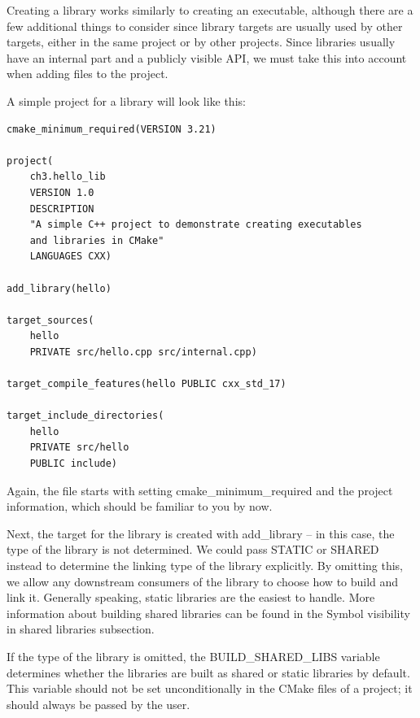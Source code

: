 
Creating a library works similarly to creating an executable, although there are a few additional things to consider since library targets are usually used by other targets, either in the same project or by other projects. Since libraries usually have an internal part and a publicly visible API, we must take this into account when adding files to the project.

A simple project for a library will look like this:

\begin{lstlisting}[style=styleCMake]
cmake_minimum_required(VERSION 3.21)

project(
	ch3.hello_lib
	VERSION 1.0
	DESCRIPTION
	"A simple C++ project to demonstrate creating executables
	and libraries in CMake"
	LANGUAGES CXX)
	
add_library(hello)

target_sources(
	hello
	PRIVATE src/hello.cpp src/internal.cpp)
	
target_compile_features(hello PUBLIC cxx_std_17)

target_include_directories(
	hello
	PRIVATE src/hello
	PUBLIC include)
\end{lstlisting}

Again, the file starts with setting cmake\_minimum\_required and the project information, which should be familiar to you by now.

Next, the target for the library is created with add\_library – in this case, the type of the library is not determined. We could pass STATIC or SHARED instead to determine the linking type of the library explicitly. By omitting this, we allow any downstream consumers of the library to choose how to build and link it. Generally speaking, static libraries are the easiest to handle. More information about building shared libraries can be found in the Symbol visibility in shared libraries subsection. 

If the type of the library is omitted, the BUILD\_SHARED\_LIBS variable determines whether the libraries are built as shared or static libraries by default. This variable should not be set unconditionally in the CMake files of a project; it should always be passed by the user.

